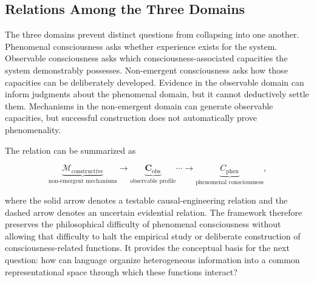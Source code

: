 \subsection{Relations Among the Three Domains}
\label{subsec:domain-relations}

The three domains prevent distinct questions from collapsing into one another. Phenomenal consciousness asks whether experience exists for the system. Observable consciousness asks which consciousness-associated capacities the system demonstrably possesses. Non-emergent consciousness asks how those capacities can be deliberately developed. Evidence in the observable domain can inform judgments about the phenomenal domain, but it cannot deductively settle them. Mechanisms in the non-emergent domain can generate observable capacities, but successful construction does not automatically prove phenomenality.

The relation can be summarized as

\begin{equation}
\underbrace{\mathcal{M}_{\mathrm{constructive}}}_{\text{non-emergent mechanisms}}
\longrightarrow
\underbrace{\mathbf{C}_{\mathrm{obs}}}_{\text{observable profile}}
\mathrel{\cdots\!\longrightarrow}
\underbrace{C_{\mathrm{phen}}}_{\text{phenomenal consciousness}},
\label{eq:three-domain-relation}
\end{equation}

where the solid arrow denotes a testable causal-engineering relation and the dashed arrow denotes an uncertain evidential relation. The framework therefore preserves the philosophical difficulty of phenomenal consciousness without allowing that difficulty to halt the empirical study or deliberate construction of consciousness-related functions. It provides the conceptual basis for the next question: how can language organize heterogeneous information into a common representational space through which these functions interact?
